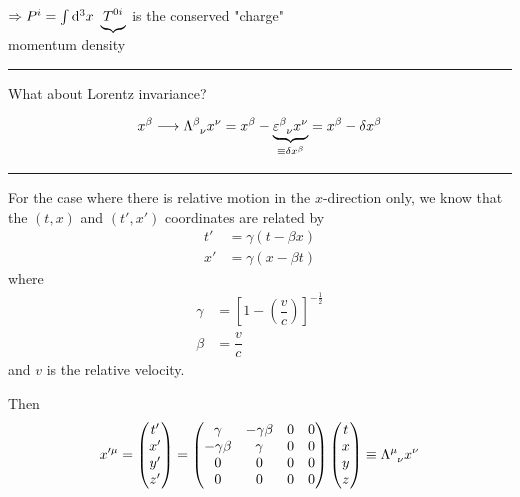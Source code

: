 \documentclass{article}
\begin{document}
$\Rightarrow \tensor{P}{^i} = \int \mathrm{d}^3 x~ \underbrace{ \tensor{T}{^0^i} }$ is the conserved "charge"
\\ \hspace*{0.75in} {\small momentum density}

\noindent\rule{\textwidth}{.5pt}


\noindent What about Lorentz invariance?

\begin{equation*}
    \tensor{x}{^\beta} \longrightarrow \tensor{\Lambda}{^\beta _\nu} \tensor{x}{^\nu} = \tensor{x}{^\beta} - \underbrace{ \tensor{\varepsilon}{^\beta _\nu} \tensor{x}{^\nu} }_{ \equiv \delta \tensor{x}{^\beta} } = \tensor{x}{^\beta} - \delta \tensor{x}{^\beta}
\end{equation*}

\noindent\rule{\textwidth}{.5pt}

\noindent For the case where there is relative motion in the $x$-direction only, we know that the $(t, x)$ and $(t', x')$ coordinates are related by
\begin{align*}
    t' &= \gamma ( t - \beta x ) \\
    x' &= \gamma ( x - \beta t )
\end{align*}
where
\begin{align*}
    \gamma &= {[ 1 - \left( \dfrac{v}{c} \right) ]}^{ -\frac{1}{2} } \\
    \beta &= \dfrac{v}{c}
\end{align*}
and $v$ is the relative velocity.

\noindent Then
\begin{equation*}
    \tensor{x}{^\prime^\mu} = %
    \begin{pmatrix}
        t' \\
        x' \\
        y' \\
        z'
    \end{pmatrix}%
    = %
    \begin{pmatrix}
        \gamma & - \gamma \beta & 0 & 0 \\
        - \gamma \beta & \gamma & 0 & 0 \\
        0 & 0 & 0 & 0 \\
        0 & 0 & 0 & 0
    \end{pmatrix}%
    \begin{pmatrix}
        t \\
        x \\
        y \\
        z
    \end{pmatrix}%
    \equiv \tensor{\Lambda}{^\mu _\nu} \tensor{x}{^\nu}
\end{equation*}
\end{document}
